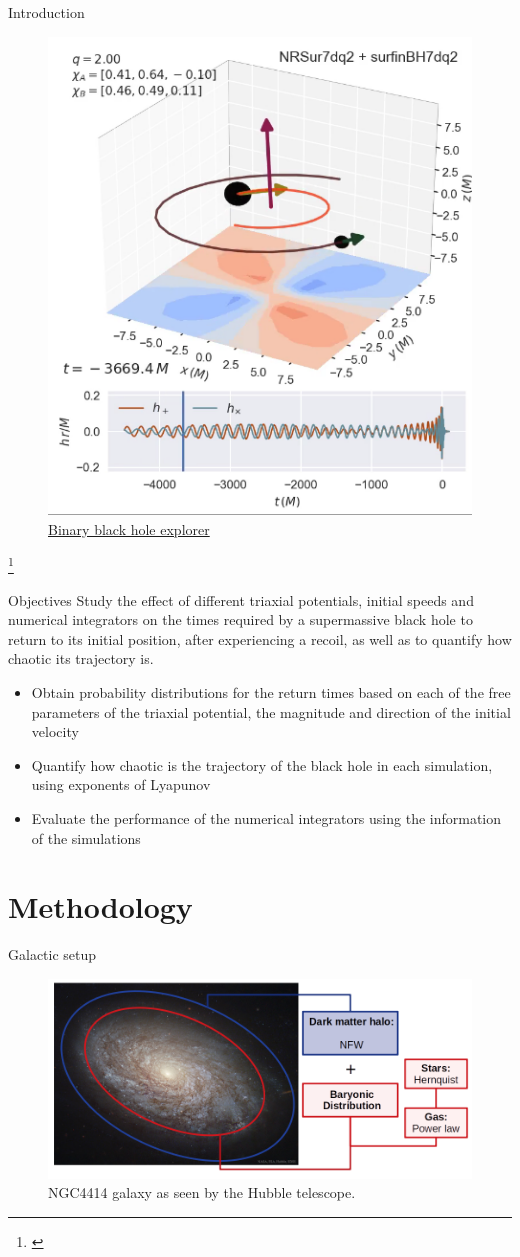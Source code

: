\documentclass{beamer}
\newcommand\blfootnote[1]
{%
	\begingroup
	\renewcommand\thefootnote{}\footnote{#1}%
	\addtocounter{footnote}{-1}%
	\endgroup
}
\newcommand{\fcite}[1]{\blfootnote{\tiny\cite{#1}}}
\begin{document}
\begin{frame}{Introduction}
	\begin{figure}
		\centering
		\includegraphics[width=0.4\linewidth]{images/example}
		\caption{\href{run:/home/juan/Documents/TesisFisica/Slides/images/super_kick.mp4}{Binary black hole explorer}}
	\end{figure}
	
	\fcite{varma2018binary}
\end{frame}

\begin{frame}{Objectives}
	\small
	Study the effect of different triaxial potentials, initial speeds and numerical integrators on the times required by a supermassive black hole to return to its initial position, after experiencing a recoil, as well as to quantify how chaotic its trajectory is.
	
	\begin{itemize}
		\item Obtain probability distributions for the return times based on each of the free parameters of the triaxial potential, the magnitude and direction of the initial velocity
		\item Quantify how chaotic is the trajectory of the black hole in each simulation, using exponents of Lyapunov
		\item Evaluate the performance of the numerical integrators using the information of the simulations
	\end{itemize}
\end{frame}

\section{Methodology}
	\begin{frame}{Galactic setup}
	\begin{figure}[h]
		\centering
		\includegraphics[width=0.8\linewidth]{../Documento/Figures/NGC4414_modified}
		\caption{NGC4414 galaxy as seen by the Hubble telescope.}
	\end{figure}
\end{frame}
\end{document}
